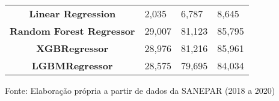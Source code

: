 \begin{table}[H]
\begin{tabular}{@{}clll@{}}
	\textbf{Linear Regression}        & 2,035                             & 6,787                            & 8,645                             \\
	\textbf{Random Forest Regressor}  & 29,007                            & 81,123                           & 85,795                            \\
	\textbf{XGBRegressor}             & 28,976                            & 81,216                           & 85,961                            \\
	\textbf{LGBMRegressor}            & 28,575                            & 79,695                           & 84,034                            \\ \bottomrule
\end{tabular}

Fonte: Elaboração própria a partir de dados da SANEPAR (2018 a 2020)
	\end{table}

